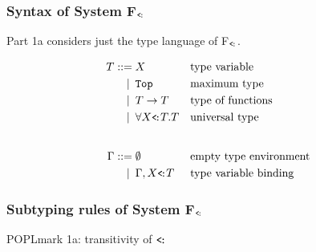 \documentclass[notheorems]{beamer}
\begin{document}
\begin{frame}

  \frametitle{Syntax of System F$_\texttt{<\!:}$}

  Part 1a considers just the type language of F$_\texttt{<\!:}$.

  \begin{align*}
    T ::=             &\; X
    && \text{type variable} \\
    \llap{\textbar\:} &\; \texttt{Top}
    && \text{maximum type} \\
    \llap{\textbar\:} &\; T \rightarrow T
    && \text{type of functions} \\
    \llap{\textbar\:} &\; \forall X\texttt{\small<\!:}T.T
    && \text{universal type} \\[2em]
    \Gamma ::=        &\; \emptyset
    && \text{empty type environment} \\
    \llap{\textbar\:} &\; \Gamma, X \texttt{\small<\!:}T
    && \text{type variable binding} \\
  \end{align*}

\end{frame}


\begin{frame}

  \frametitle{Subtyping rules of System F$_\texttt{<\!:}$}


  POPLmark 1a: transitivity of $\texttt{<\!:}$

\end{frame}
\end{document}
